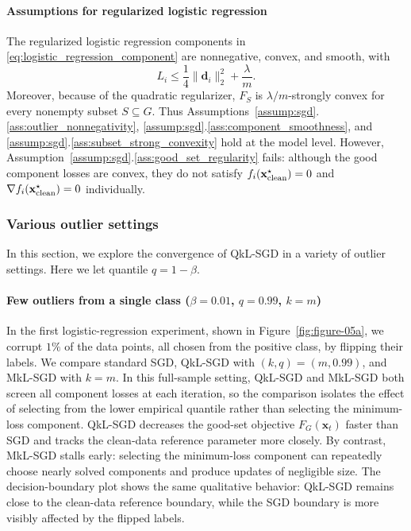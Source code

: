 \documentclass[11pt]{article}
\newcommand{\ve}[1]{\mathbf{#1}}
\begin{document}
\paragraph{Assumptions for regularized logistic regression}
The regularized logistic regression components in \eqref{eq:logistic_regression_component} are nonnegative, convex, and smooth, with
\[
L_i \le \frac14\|\ve d_i\|_2^2+\frac{\lambda}{m}.
\]
Moreover, because of the quadratic regularizer, $F_S$ is $\lambda/m$-strongly convex for every nonempty subset $S\subseteq G$. Thus Assumptions~\ref{assump:sgd}.\ref{ass:outlier_nonnegativity}, \ref{assump:sgd}.\ref{ass:component_smoothness}, and \ref{assump:sgd}.\ref{ass:subset_strong_convexity} hold at the model level. However, Assumption~\ref{assump:sgd}.\ref{ass:good_set_regularity} fails: although the good component losses are convex, they do not satisfy $f_i(\ve x^\star_{\rm clean})=0$ and $\nabla f_i(\ve x^\star_{\rm clean})=0$ individually.

\subsubsection{Various outlier settings}
In this section, we explore the convergence of QkL-SGD in a variety of outlier settings.  Here we let quantile $q = 1 - \beta$.

\paragraph{Few outliers from a single class
(\texorpdfstring{$\beta=0.01$, $q=0.99$, $k=m$}
{beta=0.01, q=0.99, k=m})}
In the first logistic-regression experiment, shown in Figure~\ref{fig:figure-05a}, we corrupt $1\%$ of the data points, all chosen from the positive class, by flipping their labels. We compare standard SGD, QkL-SGD with $(k,q)=(m,0.99)$, and MkL-SGD with $k=m$. In this full-sample setting, QkL-SGD and MkL-SGD both screen all component losses at each iteration, so the comparison isolates the effect of selecting from the lower empirical quantile rather than selecting the minimum-loss component. QkL-SGD decreases the good-set objective $F_G(\ve x_t)$ faster than SGD and tracks the clean-data reference parameter more closely. By contrast, MkL-SGD stalls early: selecting the minimum-loss component can repeatedly choose nearly solved components and produce updates of negligible size. The decision-boundary plot shows the same qualitative behavior: QkL-SGD remains close to the clean-data reference boundary, while the SGD boundary is more visibly affected by the flipped labels.
\end{document}
